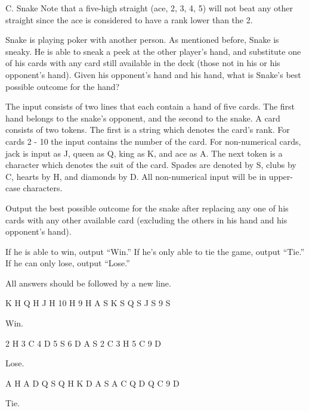 \begin{problem}{C. Snake}
 Note that a five-high straight (ace, 2, 3, 4, 5) will not beat any other straight since the ace is considered to have a rank lower than the 2.
 
 Snake is playing poker with another person. As mentioned before, Snake is sneaky. He is able to sneak a peek at the other player's hand, and substitute one of his cards with any card still available in the deck (those not in his or his opponent's hand). Given his opponent's hand and his hand, what is Snake's best possible outcome for the hand?

\end{problem}

\begin{formalin}
The input consists of two lines that each contain a hand of five cards. 
The first hand belongs to the snake's opponent, and the second to the snake.
A card consists of two tokens. The first is a string which denotes the card's rank. 
For cards 2 - 10 the input contains the number of the card. For non-numerical cards, 
jack is input as J, queen as Q, king as K, and ace as A. The next token is a character 
which denotes the suit of the card. Spades are denoted by S, clubs by C, hearts by H, 
and diamonds by D. All non-numerical input will be in upper-case characters.
\end{formalin}

\begin{formalout}
Output the best possible outcome for the snake after replacing any one of his cards with 
any other available card (excluding the others in his hand and his opponent's hand). 

If he is able to win, output ``Win.''
If he's only able to tie the game, output ``Tie.''
If he can only lose, output ``Lose.''

All answers should be followed by a new line.
\end{formalout}

\begin{datain}
K H Q H J H 10 H 9 H
A S K S Q S J S 9 S
\end{datain}
\begin{dataout}
Win.
\end{dataout}

\begin{datain}
2 H 3 C 4 D 5 S 6 D
A S 2 C 3 H 5 C 9 D
\end{datain}
\begin{dataout}
Lose.
\end{dataout}

\begin{datain}
A H A D Q S Q H K D
A S A C Q D Q C 9 D
\end{datain}
\begin{dataout}
Tie.
\end{dataout}